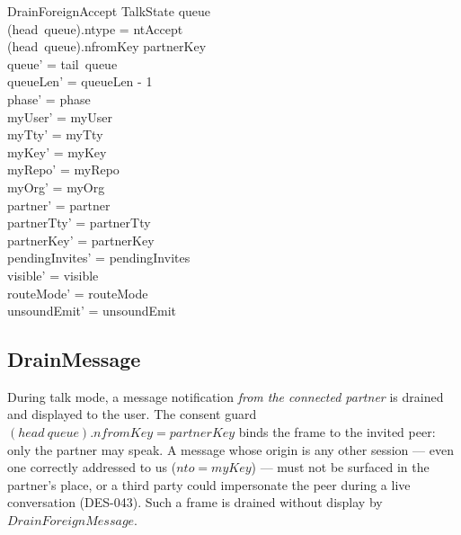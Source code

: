 \documentclass[a4paper,10pt,fleqn]{article}
\begin{document}
\begin{schema}{DrainForeignAccept}
  \Delta TalkState
\where
  queue \neq \langle \rangle \\
  (head~queue).ntype = ntAccept \\
  (head~queue).nfromKey \neq partnerKey \\
  queue' = tail~queue \\
  queueLen' = queueLen - 1 \\
  phase' = phase \\
  myUser' = myUser \\
  myTty' = myTty \\
  myKey' = myKey \\
  myRepo' = myRepo \\
  myOrg' = myOrg \\
  partner' = partner \\
  partnerTty' = partnerTty \\
  partnerKey' = partnerKey \\
  pendingInvites' = pendingInvites \\
  visible' = visible \\
  routeMode' = routeMode \\
  unsoundEmit' = unsoundEmit
\end{schema}

\subsection{DrainMessage}

During talk mode, a message notification \emph{from the connected
partner} is drained and displayed to the user.  The consent guard
$(head~queue).nfromKey = partnerKey$ binds the frame to the invited
peer: only the partner may speak.  A message whose origin is any other
session --- even one correctly addressed to us ($nto = myKey$) --- must
not be surfaced in the partner's place, or a third party could
impersonate the peer during a live conversation (DES-043).  Such a
frame is drained without display by $DrainForeignMessage$.
\end{document}
